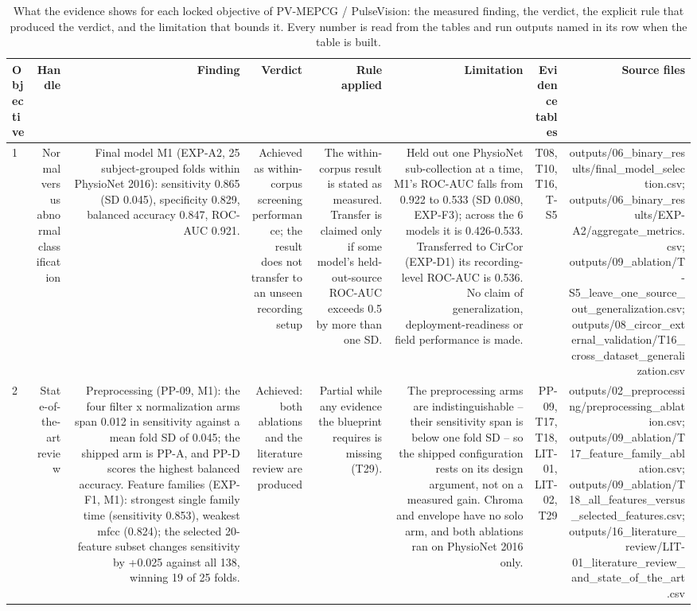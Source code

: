\begin{table}[htbp]
  \centering
  \caption{What the evidence shows for each locked objective of PV-MEPCG / PulseVision: the measured finding, the verdict, the explicit rule that produced the verdict, and the limitation that bounds it. Every number is read from the tables and run outputs named in its row when the table is built.}
  \label{tab:t30}
  \begin{tabular}{lrrrrrrr}
    \toprule
    Objective & Handle & Finding & Verdict & Rule applied & Limitation & Evidence tables & Source files \\
    \midrule
    1 & Normal versus abnormal classification & Final model M1 (EXP-A2, 25 subject-grouped folds within PhysioNet 2016): sensitivity 0.865 (SD 0.045), specificity 0.829, balanced accuracy 0.847, ROC-AUC 0.921. & Achieved as within-corpus screening performance; the result does not transfer to an unseen recording setup & The within-corpus result is stated as measured. Transfer is claimed only if some model's held-out-source ROC-AUC exceeds 0.5 by more than one SD. & Held out one PhysioNet sub-collection at a time, M1's ROC-AUC falls from 0.922 to 0.533 (SD 0.080, EXP-F3); across the 6 models it is 0.426-0.533. Transferred to CirCor (EXP-D1) its recording-level ROC-AUC is 0.536. No claim of generalization, deployment-readiness or field performance is made. & T08, T10, T16, T-S5 & outputs/06\_binary\_results/final\_model\_selection.csv; outputs/06\_binary\_results/EXP-A2/aggregate\_metrics.csv; outputs/09\_ablation/T-S5\_leave\_one\_source\_out\_generalization.csv; outputs/08\_circor\_external\_validation/T16\_cross\_dataset\_generalization.csv \\
    2 & State-of-the-art review & Preprocessing (PP-09, M1): the four filter x normalization arms span 0.012 in sensitivity against a mean fold SD of 0.045; the shipped arm is PP-A, and PP-D scores the highest balanced accuracy. Feature families (EXP-F1, M1): strongest single family time (sensitivity 0.853), weakest mfcc (0.824); the selected 20-feature subset changes sensitivity by +0.025 against all 138, winning 19 of 25 folds. & Achieved: both ablations and the literature review are produced & Partial while any evidence the blueprint requires is missing (T29). & The preprocessing arms are indistinguishable -- their sensitivity span is below one fold SD -- so the shipped configuration rests on its design argument, not on a measured gain. Chroma and envelope have no solo arm, and both ablations ran on PhysioNet 2016 only. & PP-09, T17, T18, LIT-01, LIT-02, T29 & outputs/02\_preprocessing/preprocessing\_ablation.csv; outputs/09\_ablation/T17\_feature\_family\_ablation.csv; outputs/09\_ablation/T18\_all\_features\_versus\_selected\_features.csv; outputs/16\_literature\_review/LIT-01\_literature\_review\_and\_state\_of\_the\_art.csv \\

\end{tabular}
\end{table}
